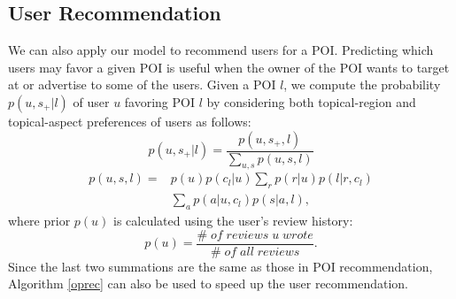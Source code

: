 \subsection{User Recommendation}
We can also apply our model to recommend
users for a POI. Predicting which users may favor a given
POI is useful when the owner of the POI wants to target at or advertise
to some of the users.
Given a POI $l$, we
compute the probability $p(u,s_+|l)$
of user $u$ favoring POI $l$ by considering both topical-region
and topical-aspect preferences of users as follows:
\begin{equation}
p(u,s_+|l)=\frac{p(u,s_+,l)}{\sum_{u,s}{p(u,s,l)}}
\label{eq:puspl}
\end{equation}
\begin{equation}
\begin{split}
p(u,s,l)=&p(u)p(c_l|u)\sum_{r}{p(r|u)p(l|r,c_l)}\\
&\sum_{a}{p(a|u,c_l)p(s|a,l)},
\end{split}
\label{eq:pusl}
\end{equation}
where prior $p(u)$ is calculated
using the user's review history:
\[p(u)=\frac{\#\; of\; reviews\; u\; wrote}{\#\; of\; all\; reviews}.\]
Since the last two summations are the same as those in
POI recommendation,
Algorithm \ref{oprec} can also be used to speed up the user recommendation.

